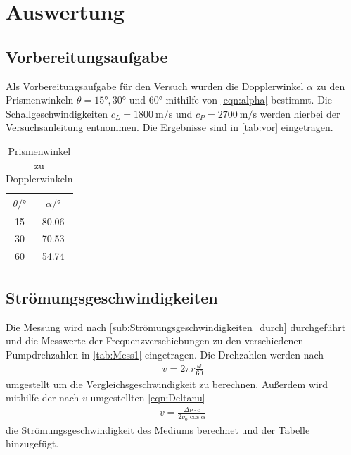 \section{Auswertung}
\label{sec:Auswertung}

\subsection{Vorbereitungsaufgabe}
Als Vorbereitungsaufgabe für den Versuch wurden die Dopplerwinkel $\alpha$ zu den Prismenwinkeln $\theta = 15° , 30°$ und $60°$
mithilfe von \autoref{eqn:alpha} bestimmt.
Die Schallgeschwindigkeiten $c_L=\qty{1800}{\meter\per\second}$ und $c_P=\qty{2700}{\meter\per\second}$ werden hierbei der Versuchsanleitung
\cite{VUS3} entnommen.
Die Ergebnisse sind in \autoref{tab:vor} eingetragen.

\begin{table}[H]
    \centering
    \caption{Prismenwinkel zu Dopplerwinkeln}
    \begin{tabular}{S[table-format=2.0] S[table-format=2.2]}
        \toprule
        {$\theta / \si{\degree}$} & {$\alpha  / \si{\degree}$}  \\
         & 80.06  \\
        30 & 70.53  \\
        60 & 54.74  \\
        \bottomrule
    \end{tabular}
    \label{tab:vor}
\end{table}

\subsection{Strömungsgeschwindigkeiten}
\label{sub:Strömungsgeschwindigkeiten}

Die Messung wird nach \autoref{sub:Strömungsgeschwindigkeiten_durch} durchgeführt und die Messwerte der Frequenzverschiebungen
zu den verschiedenen Pumpdrehzahlen in \autoref{tab:Mess1} eingetragen.
Die Drehzahlen werden nach
\begin{align*}
  v = 2 \pi r \frac{\omega}{60} 
\end{align*}\cite{Umrechnung}
umgestellt um die Vergleichsgeschwindigkeit zu berechnen.
Außerdem wird mithilfe der nach $v$ umgestellten \autoref{eqn:Deltanu}
\begin{align}
  v= \frac{\Delta \nu \cdot c}{2 \nu_0 \cos{\alpha}} \label{eqn:v}
\end{align}
die Strömungsgeschwindigkeit des Mediums berechnet und der Tabelle hinzugefügt. 


